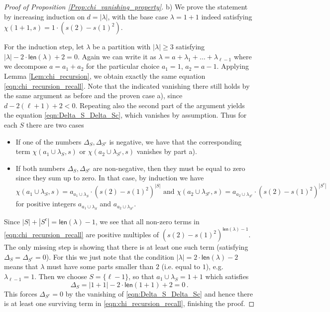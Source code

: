 \documentclass[authorcolumns,numberwithinsect]{no-lipics-v2022}
\begin{document}
\begin{proof}[Proof of Proposition \ref{Prop:chi_vanishing_property}]
\noindent b) We prove the statement by increasing induction on $d=|\lambda|$, with the base case $\lambda=1+1$ indeed satisfying $\chi(1+1,s)=1 \cdot (s(2)-s(1)^2)$. 

For the induction step, let $\lambda$ be a partition with $|\lambda| \geq 3$ satisfying $|\lambda|-2\cdot \mathsf{len}(\lambda)+2 = 0$. Again we can write it as $\lambda = a+\lambda_1 + \ldots + \lambda_{\ell-1}$ where we decompose $a=a_1+a_2$ for the particular choice $a_1=1$, $a_2=a-1$. Applying Lemma \ref{Lem:chi_recursion}, we obtain exactly the same equation \eqref{eqn:chi_recursion_recall}. Note that the indicated vanishing there still holds by the same argument as before and the proven case a), since $d-2(\ell+1)+2<0$. 
Repeating also the second part of the argument yields the equation \eqref{eqn:Delta_S_Delta_Sc}, which vanishes by assumption. Thus for each $S$ there are two cases
\begin{itemize}
    \item If one of the numbers $\Delta_S, \Delta_{S^c}$ is negative, we have that the corresponding term $\chi(a_1 \cup \lambda_S, s)$ or $\chi(a_2 \cup \lambda_{S^c}, s)$ vanishes by part a).
    \item If both numbers $\Delta_S, \Delta_{S^c}$ are non-negative, then they must be equal to zero since they sum up to zero. In that case, by induction we have
    \[
    \chi(a_1 \cup \lambda_S, s) = a_{a_1 \cup \lambda_S} \cdot (s(2)-s(1)^2)^{|S|} \text{ and }\chi(a_2 \cup \lambda_{S^c}, s) = a_{a_2 \cup \lambda_{S^c}} \cdot (s(2)-s(1)^2)^{|S^c|}
    \]
    for positive integers $a_{a_1 \cup \lambda_S}$ and $a_{a_2 \cup \lambda_{S^c}}$.
\end{itemize}
Since $|S|+|S^c|=\mathsf{len}(\lambda)-1$, we see that all non-zero terms in \eqref{eqn:chi_recursion_recall} are positive multiples of $(s(2)-s(1)^2)^{\mathsf{len}(\lambda)-1}$. The only missing step is showing that there is at least one such term (satisfying $\Delta_S=\Delta_{S^c}=0$). For this we just note that the condition $|\lambda|=2 \cdot \mathsf{len}(\lambda)-2$ means that $\lambda$ must have some parts smaller than $2$ (i.e. equal to $1$), e.g. $\lambda_{\ell-1}=1$. Then we choose $S=\{\ell-1\}$, so that $a_1 \cup \lambda_S = 1+1$ which satisfies
\[
\Delta_S = |1+1|-2 \cdot \mathsf{len}(1+1) +2 = 0\,.
\]
This forces $\Delta_{S^c}=0$ by the vanishing of \eqref{eqn:Delta_S_Delta_Sc} and hence there is at least one surviving term in \eqref{eqn:chi_recursion_recall}, finishing the proof.
\end{proof}
\end{document}
